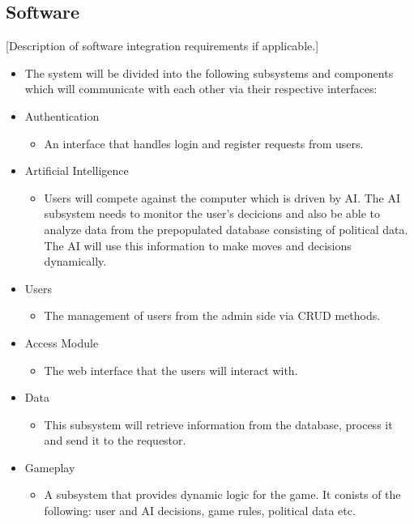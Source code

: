 \documentclass{article}
\begin{document}
    \subsection{Software}
    [Description of software integration requirements if applicable.]
    \begin{itemize}
    \item The system will be divided into the following subsystems and components which will communicate with each other via their respective interfaces:

    	\item Authentication  
	    \begin{itemize}
				\item An interface that handles login and register requests from users.
		\end{itemize}

		\item Artificial Intelligence 
   		\begin{itemize}
				\item Users will compete against the computer which is driven by AI. The AI subsystem needs to monitor the user's decicions and also be able to analyze data from the prepopulated database consisting of political data. The AI will use this information to make moves and decisions dynamically.
		\end{itemize}

		\item Users 
		\begin{itemize}
				\item The management of users from the admin side via CRUD methods.   		
		\end{itemize}

		\item Access Module 
		\begin{itemize}
				\item The web interface that the users will interact with.		
		\end{itemize}

		\item Data
		\begin{itemize}
				\item This subsystem will retrieve information from the database, process it and send it to the requestor.
		\end{itemize}

		\item Gameplay
		\begin{itemize}
				\item A subsystem that provides dynamic logic for the game. It conists of the following: user and AI decisions, game rules, political data etc.
		\end{itemize}
	\end{itemize}
\end{document}
